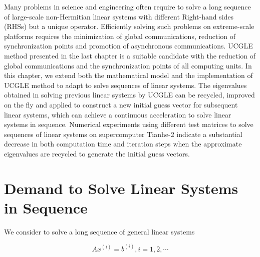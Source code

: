 \begin{displayquote}
	\textsf{Many problems in science and engineering often require to solve a long sequence of large-scale non-Hermitian linear systems with different Right-hand sides (RHSs) but a unique operator. Efficiently solving such problems on extreme-scale platforms requires the minimization of global communications, reduction of synchronization points and promotion of asynchronous communications. UCGLE method presented in the last chapter is a suitable candidate with the reduction of global communications and the synchronization points of all computing units. In this chapter, we extend both the mathematical model and the implementation of UCGLE method to adapt to solve sequences of linear systems. The eigenvalues obtained in solving previous linear systems by UCGLE can be recycled, improved on the fly and applied to construct a new initial guess vector for subsequent linear systems, which can achieve a continuous acceleration to solve linear systems in sequence. Numerical experiments using different test matrices to solve sequences of linear systems on supercomputer Tianhe-2 indicate a substantial decrease in both computation time and iteration steps when the approximate eigenvalues are recycled to generate the initial guess vectors.}
\end{displayquote}
 
\vspace{0.6in}

\section{Demand to Solve Linear Systems in Sequence}

We consider to solve a long sequence of general linear systems 

\begin{equation}
Ax^{(i)}=b^{(i)}, i=1,2,\cdots
\end{equation}

